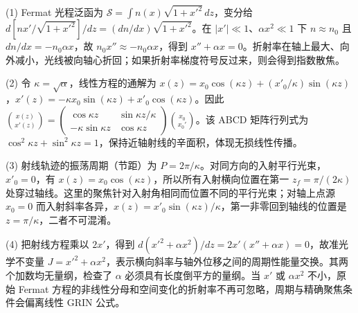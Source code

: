 (1) Fermat 光程泛函为 \(\mathcal S=\int n(x)\sqrt{1+x'^2}\,dz\)，变分给 \(d[nx'/\sqrt{1+x'^2}]/dz=(dn/dx)\sqrt{1+x'^2}\)。在 \(|x'|\ll1\)、\(\alpha x^2\ll1\) 下 \(n\approx n_0\) 且 \(dn/dx=-n_0\alpha x\)，故 \(n_0x''\approx-n_0\alpha x\)，得到 \(x''+\alpha x=0\)。折射率在轴上最大、向外减小，光线被向轴心折回；如果折射率梯度符号反过来，则会得到指数散焦。

(2) 令 \(\kappa=\sqrt\alpha\)，线性方程的通解为 \(x(z)=x_0\cos(\kappa z)+(x'_0/\kappa)\sin(\kappa z)\)，\(x'(z)=-\kappa x_0\sin(\kappa z)+x'_0\cos(\kappa z)\)。因此 \(\binom{x(z)}{x'(z)}=\begin{pmatrix}\cos\kappa z&\sin\kappa z/\kappa\\-\kappa\sin\kappa z&\cos\kappa z\end{pmatrix}\binom{x_0}{x_0'}\)。该 ABCD 矩阵行列式为 \(\cos^2\kappa z+\sin^2\kappa z=1\)，保持近轴射线的辛面积，体现无损线性传播。

(3) 射线轨迹的振荡周期（节距）为 \(P=2\pi/\kappa\)。对同方向的入射平行光束，\(x'_0=0\)，有 \(x(z)=x_0\cos(\kappa z)\)，所以所有入射横向位置在第一 \(z_f=\pi/(2\kappa)\) 处穿过轴线。这里的聚焦针对入射角相同而位置不同的平行光束；对轴上点源 \(x_0=0\) 而入射斜率各异，\(x(z)=x'_0\sin(\kappa z)/\kappa\)，第一非零回到轴线的位置是 \(z=\pi/\kappa\)，二者不可混淆。

(4) 把射线方程乘以 \(2x'\)，得到 \(d(x'^2+\alpha x^2)/dz=2x'(x''+\alpha x)=0\)，故准光学不变量 \(J=x'^2+\alpha x^2\)，表示横向斜率与轴外位移之间的周期性能量交换。其两个加数均无量纲，检查了 \(\alpha\) 必须具有长度倒平方的量纲。当 \(x'\) 或 \(\alpha x^2\) 不小，原始 Fermat 方程的非线性分母和空间变化的折射率不再可忽略，周期与精确聚焦条件会偏离线性 GRIN 公式。
